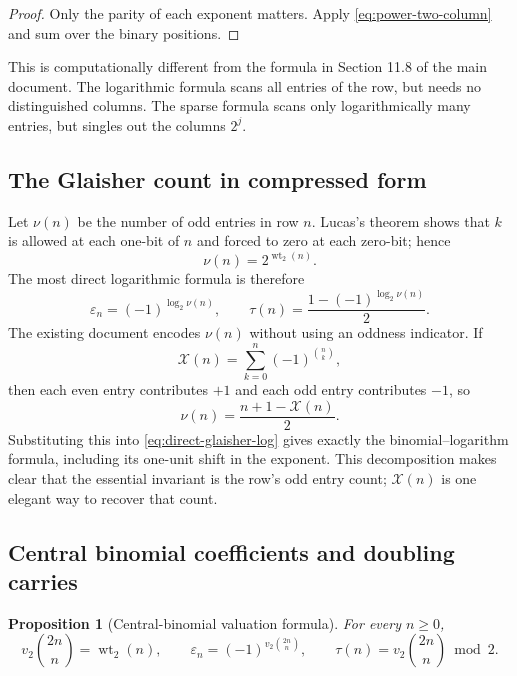 \documentclass[11pt,oneside]{article}
\newtheorem{proposition}[theorem]{Proposition}
\theoremstyle{definition}
\theoremstyle{remark}
\newcommand{\wt}{\operatorname{wt}_2}
\newcommand{\vtwo}{v_2}
\begin{document}
\begin{proof}
Only the parity of each exponent matters.  Apply
\eqref{eq:power-two-column} and sum over the binary positions.
\end{proof}

This is computationally different from the formula in Section 11.8 of the
main document.  The logarithmic formula scans all entries of the row, but
needs no distinguished columns.  The sparse formula scans only logarithmically
many entries, but singles out the columns \(2^j\).

\subsection{The Glaisher count in compressed form}

Let \(\nu(n)\) be the number of odd entries in row \(n\).  Lucas's theorem
shows that \(k\) is allowed at each one-bit of \(n\) and forced to zero at each
zero-bit; hence
\begin{equation}
 \nu(n)=2^{\wt(n)}.
 \label{eq:glaisher-again}
\end{equation}
The most direct logarithmic formula is therefore
\begin{equation}
 \varepsilon_n=(-1)^{\log_2\nu(n)},
 \qquad
 \tau(n)=\frac{1-(-1)^{\log_2\nu(n)}}{2}.
 \label{eq:direct-glaisher-log}
\end{equation}
The existing document encodes \(\nu(n)\) without using an oddness indicator.
If
\begin{equation}
 \mathcal X(n)=\sum_{k=0}^n(-1)^{\binom nk},
 \label{eq:X-repeat}
\end{equation}
then each even entry contributes \(+1\) and each odd entry contributes \(-1\),
so
\begin{equation}
 \nu(n)=\frac{n+1-\mathcal X(n)}{2}.
 \label{eq:nu-from-X}
\end{equation}
Substituting this into \eqref{eq:direct-glaisher-log} gives exactly the
binomial--logarithm formula, including its one-unit shift in the exponent.
This decomposition makes clear that the essential invariant is the row's odd
entry count; \(\mathcal X(n)\) is one elegant way to recover that count.

\subsection{Central binomial coefficients and doubling carries}

\begin{proposition}[Central-binomial valuation formula]
\label{prop:central-binomial}
For every \(n\ge0\),
\begin{equation}
 \vtwo\binom{2n}{n}=\wt(n),
 \qquad
 \varepsilon_n=(-1)^{\vtwo\binom{2n}{n}},
 \qquad
 \tau(n)=\vtwo\binom{2n}{n}\bmod2.
 \label{eq:central-binomial-formula}
\end{equation}
\end{proposition}
\end{document}
